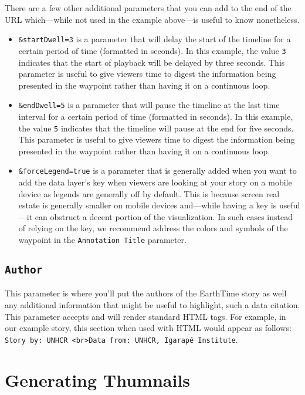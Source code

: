 \documentclass[
]{krantz}
\begin{document}
There are a few other additional parameters that you can add to the end of the URL which---while not used in the example above---is useful to know nonetheless.

\begin{itemize}
\item
  \texttt{\&startDwell=3} is a parameter that will delay the start of the timeline for a certain period of time (formatted in seconds). In this example, the value \texttt{3} indicates that the start of playback will be delayed by three seconds. This parameter is useful to give viewers time to digest the information being presented in the waypoint rather than having it on a continuous loop.
\item
  \texttt{\&endDwell=5} is a parameter that will pause the timeline at the last time interval for a certain period of time (formatted in seconds). In this example, the value \texttt{5} indicates that the timeline will pause at the end for five seconds. This parameter is useful to give viewers time to digest the information being presented in the waypoint rather than having it on a continuous loop.
\item
  \texttt{\&forceLegend=true} is a parameter that is generally added when you want to add the data layer's key when viewers are looking at your story on a mobile device as legends are generally off by default. This is because screen real estate is generally smaller on mobile devices and---while having a key is useful---it can obstruct a decent portion of the visualization. In such cases instead of relying on the key, we recommend address the colors and symbols of the waypoint in the \texttt{Annotation\ Title} parameter.
\end{itemize}

\hypertarget{author}{%
\subsection*{\texorpdfstring{\texttt{Author}}{Author}}\label{author}}


This parameter is where you'll put the authors of the EarthTime story as well any additional information that might be useful to highlight, such a data citation. This parameter accepts and will render standard HTML tags. For example, in our example story, this section when used with HTML would appear as follows: \texttt{Story\ by:\ UNHCR\ \textless{}br\textgreater{}Data\ from:\ UNHCR,\ Igarapé\ Institute}.

\hypertarget{generating-thumnails}{%
\section{Generating Thumnails}\label{generating-thumnails}}
\end{document}

